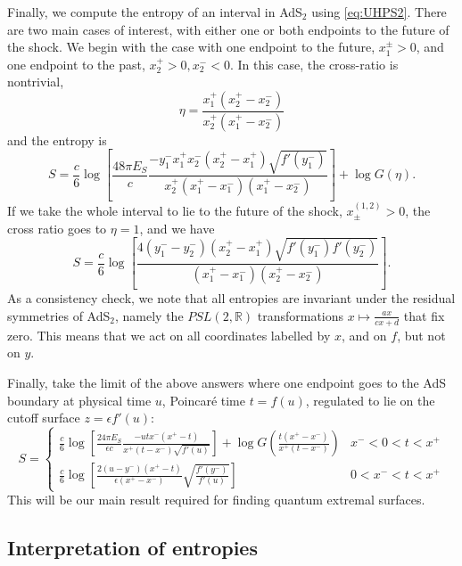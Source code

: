 \documentclass[12pt]{article}
\newcommand{\RR}{\mathbb{R}}
\begin{document}
Finally, we compute the entropy of an interval in AdS$_2$ using \eqref{eq:UHPS2}. There are two main cases of interest, with either one or both endpoints to the future of the shock. We begin with the case with one endpoint to the future, $x_1^{\pm}>0$, and one endpoint to the past, $x_2^+>0,x_2^-<0$. In this case, the cross-ratio is nontrivial,
\begin{equation}
	\eta = \frac{x_1^+(x_2^+-x_2^-)}{x_2^+(x_1^+-x_2^-)}
\end{equation}
and the entropy is
\begin{equation}\label{eq:entropy1}
	S=\frac{c}{6}\log\left[\frac{48\pi E_S}{c}   \frac{ -y_1^- x_1^+x_2^-(x_2^+-x_1^+)\sqrt{f'(y_1^-)}}{x_2^+(x_1^+-x_1^-)(x_1^+-x_2^-)} \right] + \log G(\eta).
\end{equation}
If we take the whole interval to lie to the future of the shock, $x^{(1,2)}_{\pm}>0$, the cross ratio goes to $\eta=1$, and we have
\begin{equation}\label{eq:entropy2}
	S = \frac{c}{6}\log\left[   \frac{4(y_1^--y_2^-)(x_2^+-x_1^+)\sqrt{f'(y_1^-)f'(y_2^-)}}{(x_1^+-x_1^-)(x_2^+-x_2^-)} \right].
\end{equation}
As a consistency check, we note that all entropies are invariant under the residual symmetries of AdS$_2$, namely the $PSL(2,\RR)$ transformations $x\mapsto \frac{ax}{cx+d}$ that fix zero. This means that we act on all coordinates labelled by $x$, and on $f$, but not on $y$.

Finally, take the limit of the above answers where one endpoint goes to the AdS boundary at physical time $u$, Poincar\'e time $t=f(u)$, regulated to lie on the cutoff surface $z=\epsilon f'(u)$:
\begin{equation}\label{eq:Sresults}
S=
	\begin{cases}
		\frac{c}{6}\log\left[\frac{24\pi E_S}{\epsilon c}   \frac{ -u t x^-(x^+-t)}{x^+(t-x^-)\sqrt{f'(u)}} \right] + \log G\left(\frac{t(x^+-x^-)}{x^+(t-x^-)}\right) & x^-\!<0<t<x^+ \\[15pt]
			\frac{c}{6}\log\left[   \frac{2(u-y^-)(x^+-t)}{\epsilon (x^+-x^-)} \sqrt{\frac{f'(y^-)}{f'(u)}} \right] & 0<x^-\!<t<x^+
	\end{cases}
\end{equation}
This will be our main result required for finding quantum extremal surfaces.

\subsection{Interpretation of entropies}
\end{document}
